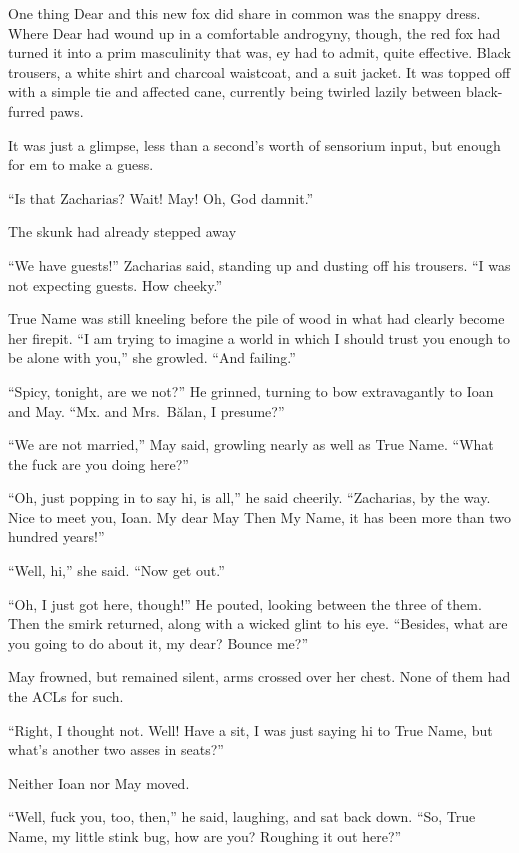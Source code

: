 One thing Dear and this new fox did share in common was the snappy dress. Where Dear had wound up in a comfortable androgyny, though, the red fox had turned it into a prim masculinity that was, ey had to admit, quite effective. Black trousers, a white shirt and charcoal waistcoat, and a suit jacket. It was topped off with a simple tie and affected cane, currently being twirled lazily between black-furred paws.

It was just a glimpse, less than a second's worth of sensorium input, but enough for em to make a guess.

``Is that Zacharias? Wait! May! Oh, God damnit.''

The skunk had already stepped away

``We have guests!'' Zacharias said, standing up and dusting off his trousers. ``I was not expecting guests. How cheeky.''

True Name was still kneeling before the pile of wood in what had clearly become her firepit. ``I am trying to imagine a world in which I should trust you enough to be alone with you,'' she growled. ``And failing.''

``Spicy, tonight, are we not?'' He grinned, turning to bow extravagantly to Ioan and May. ``Mx. and Mrs.~Bălan, I presume?''

``We are not married,'' May said, growling nearly as well as True Name. ``What the fuck are you doing here?''

``Oh, just popping in to say hi, is all,'' he said cheerily. ``Zacharias, by the way. Nice to meet you, Ioan. My dear May Then My Name, it has been more than two hundred years!''

``Well, hi,'' she said. ``Now get out.''

``Oh, I just got here, though!'' He pouted, looking between the three of them. Then the smirk returned, along with a wicked glint to his eye. ``Besides, what are you going to do about it, my dear? Bounce me?''

May frowned, but remained silent, arms crossed over her chest. None of them had the ACLs for such.

``Right, I thought not. Well! Have a sit, I was just saying hi to True Name, but what's another two asses in seats?''

Neither Ioan nor May moved.

``Well, fuck you, too, then,'' he said, laughing, and sat back down. ``So, True Name, my little stink bug, how are you? Roughing it out here?''

